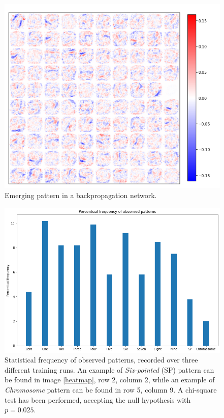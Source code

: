 \documentclass[a4paper]{report}
\begin{document}
\begin{figure} [H]
    \centering
    \includegraphics [width = 12cm] {h/backnet.png}
    \caption{Emerging pattern in a backpropagation network. }
    \label{backnet}
\end{figure}

\begin{figure} [H]
    \centering
    \includegraphics [width=12cm ] {o/bar2.png}
    \caption{Statistical frequency of observed patterns, recorded over three different training runs. An example of \textit{Six-pointed} (SP) pattern can be found in image \ref{heatmap}, row 2, column 2, while an example of \textit{Chromosome} pattern can be found in row 5, column 9. A chi-square test has been performed, accepting the null hypothesis with $p =0.025$.}
    \label{ii_hist}
\end{figure}
\end{document}
